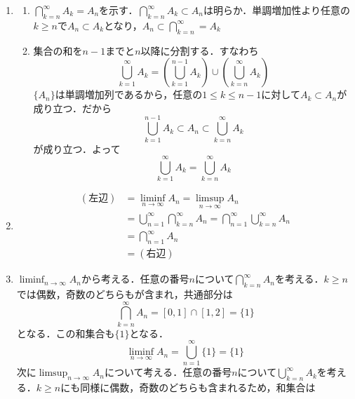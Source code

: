 \documentclass[dvipdfmx, leqno]{jsreport}
\begin{document}
\begin{souanswer}
\begin{enumerate}
    \item 
\begin{enumerate}
    \item $\bigcap_{k= n}^\infty A_k= A_n$を示す．$\bigcap_{k= n}^\infty A_k\subset A_n$は明らか．単調増加性より任意の$k\ge n$で$A_n\subset A_k$となり，$A_n\subset \bigcap_{k= n}^\infty= A_k$
    
    \item 集合の和を$n- 1$までと$n$以降に分割する．すなわち
\begin{equation}
    \bigcup_{k= 1}^\infty A_k= \left(\bigcup_{k= 1}^{n- 1} A_k\right)\cup \left(\bigcup_{k= n}^\infty A_k\right)
\end{equation}
    $\{A_n\}$は単調増加列であるから，任意の$1\le k\le n- 1$に対して$A_k\subset A_n$が成り立つ．だから
\begin{equation}
    \bigcup_{k= 1}^{n- 1} A_k\subset A_n\subset \bigcup_{k= n}^\infty A_k
\end{equation}
    が成り立つ．よって
\begin{equation}
    \bigcup_{k= 1}^\infty A_k= \bigcup_{k= n}^\infty A_k
\end{equation}
\end{enumerate}
    \item 
\begin{align*}
    (左辺)
    &= \liminf_{n\to \infty}A_n= \limsup_{n\to \infty}A_n\\
    &= \bigcup_{n= 1}^\infty \bigcap_{k= n}^\infty A_n= \bigcap_{n= 1}^\infty \bigcup_{k= n}^\infty A_n\\
    &= \bigcap_{n= 1}^\infty A_n\\
    &= (右辺)
\end{align*}
    \item $\liminf_{n\to \infty} A_n$から考える．任意の番号$n$について$\bigcap_{k= n}^\infty A_n$を考える．$k\ge n$では偶数，奇数のどちらもが含まれ，共通部分は
\begin{equation}
    \bigcap_{k= n}^\infty A_n= [0, 1]\cap [1, 2]= \{1\}
\end{equation}
    となる．この和集合も$\{1\}$となる．
\begin{equation}
    \liminf_{n\to \infty} A_n= \bigcup_{n= 1}^\infty \{1\}= \{1\}
\end{equation}
    次に$\limsup_{n\to \infty} A_n$について考える．任意の番号$n$について$\bigcup_{k= n}^\infty A_k$を考える．$k\ge n$にも同様に偶数，奇数のどちらも含まれるため，和集合は

\end{enumerate}
\end{souanswer}
\end{document}

